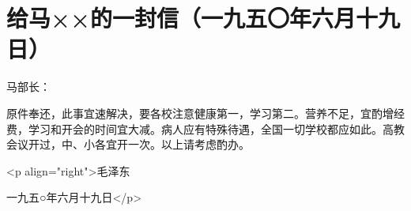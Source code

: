 \section[给马××的一封信（一九五〇年六月十九日）]{给马××的一封信（一九五〇年六月十九日）}


马部长：

原件奉还，此事宜速解决，要各校注意健康第一，学习第二。营养不足，宜酌增经费，学习和开会的时间宜大减。病人应有特殊待遇，全国一切学校都应如此。高教会议开过，中、小各宜开一次。以上请考虑酌办。

<p align="right">毛泽东

一九五○年六月十九日</p>


